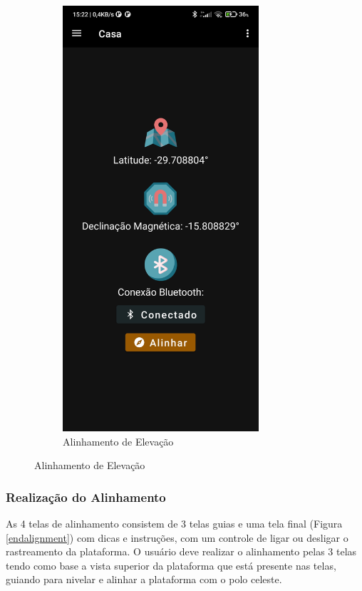 \begin{figure}[!htb]
\begin{subfigure}[b]{0.3\textwidth}
		\includegraphics[width=0.8\textwidth]{figuras/desAplicativo/conectado}
		\caption{Alinhamento de Elevação}
	\end{subfigure}
\end{figure}




\subsubsection{Realização do Alinhamento}
As 4 telas de alinhamento consistem de 3 telas guias e uma tela final (Figura \ref{endalignment}) com dicas e instruções, com um controle de ligar ou desligar o rastreamento da plataforma. O usuário deve realizar o alinhamento pelas 3 telas tendo como base a vista superior da plataforma que está presente nas telas, guiando para nivelar e alinhar a plataforma com o polo celeste. 


